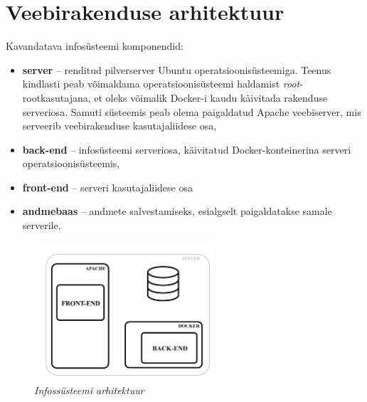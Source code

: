 \section{Veebirakenduse arhitektuur}
Kavandatava infosüsteemi komponendid:
\begin{itemize}
    \item \textbf{server} -- renditud pilverserver Ubuntu operatsioonisüsteemiga. Teenus kindlasti peab võimaldama operatsioonisüsteemi
    haldamist \textit{root}-rootkasutajana, et oleks võimalik Docker-i kaudu käivitada rakenduse serveriosa. Samuti süsteemis peab olema paigaldatud
    Apache veebiserver, mis serveerib veebirakenduse kasutajaliidese osa,
    \item \textbf{back-end} -- infosüsteemi serveriosa, käivitatud Docker-konteinerina serveri operatsioonisüsteemis,
    \item \textbf{front-end} -- serveri kasutajaliidese osa
    \item \textbf{andmebaas} -- andmete salvestamiseks, esialgselt paigaldatakse samale serverile.
\end{itemize}

\begin{figure}[ht]
    \centering
    \includegraphics[width=0.6\textwidth]{figures/analysis/architecture.png}
    \caption[Infossüsteemi arhitektuur]{\textit{Infossüsteemi arhitektuur}}
    \label{fig:architecture}
\end{figure}